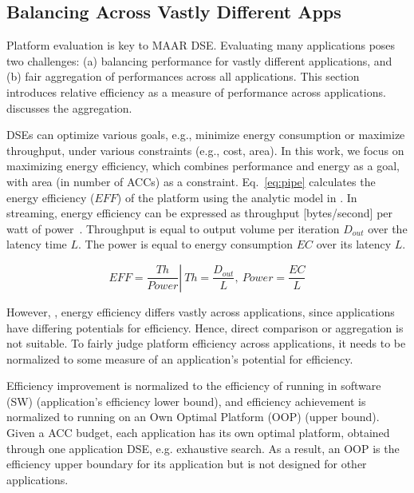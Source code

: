 \vspace{-2pt}
\subsection{Balancing Across Vastly Different Apps}
\label{subsec:relativeEff}

Platform evaluation is key to MAAR DSE. Evaluating many applications poses two challenges: (a) balancing performance for vastly different applications, and (b) fair aggregation of performances across all applications. This section introduces relative efficiency as a measure of performance across applications.  discusses the aggregation.

DSEs can optimize various goals, e.g., minimize energy consumption or maximize throughput, under various constraints (e.g., cost, area). In this work, we focus on maximizing energy efficiency, which combines performance and energy as a goal, with area (in number of ACCs) as a constraint. Eq.~\eqref{eq:pipe} calculates the energy efficiency ($EFF$) of the platform using the analytic model in . In streaming, energy efficiency can be expressed as throughput [bytes/second] per watt of power~\cite{zhou2013energy}. Throughput is equal to output volume per iteration $D_{out}$ over the latency time $L$. The power is equal to energy consumption $EC$ over its latency $L$.

\vspace{-8pt}
\begin{equation}
	EFF = \left. \frac{Th}{Power} \right\vert\ Th = \frac{D_{out}}{L},\ Power = \frac{EC}{L}
\label{eq:pipe}
\end{equation}

However, , energy efficiency differs vastly across applications, since applications have differing potentials for efficiency. Hence, direct comparison or aggregation is not suitable. To fairly judge platform efficiency across applications, it needs to be normalized to some measure of an application's potential for efficiency.

Efficiency improvement is normalized to the efficiency of running in software (SW) (application's efficiency lower bound), and efficiency achievement is normalized to running on an Own Optimal Platform (OOP) (upper bound). Given a ACC budget, each application has its own optimal platform, obtained through one application DSE, e.g. exhaustive search. As a result, an OOP is the efficiency upper boundary for its application but is not designed for other applications.


